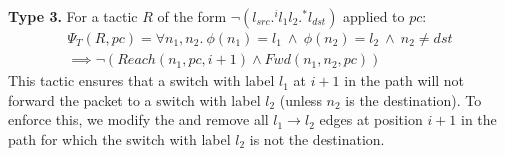 \noindent\textbf{Type 3.} For a tactic $R$  
of the form $\neg (l_{src}  .^i l_1 l_2 .^* l_{dst})$ applied to $pc$: 
\begin{multline} \label{eq:t3}
\Psi_T(R,pc) = \forall n_1, n_2.~\phi(n_1) = l_1~\wedge~ \phi(n_2) = l_2 ~\wedge~ n_2 \not=dst \\  \implies 
\neg (Reach(n_1, pc, i + 1) \wedge Fwd(n_1, n_2, pc))
\end{multline}
This tactic ensures that a switch with label $l_1$ at $i+1$ in the path
will not forward the packet to a switch with label $l_2$ (unless $n_2$ is the destination). 
To enforce this, we modify the  and remove all $l_1\rightarrow l_2$
edges at position $i+1$ in the path for which the switch with label $l_2$  is not the destination.  


